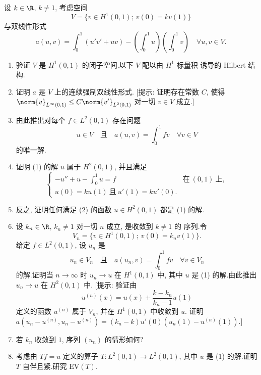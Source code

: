 \begin{exercise}
\label{exer:8.30}
设 $k\in\R$, $k\ne1$, 考虑空间
\begin{equation*}
V=\{v\in H^1(0,1);\ v(0)=kv(1)\}
\end{equation*}
与双线性形式
\begin{equation*}
a(u,v)=\int_0^1(u'v'+uv)
-\left(\int_0^1u\right)\left(\int_0^1v\right)\quad\forall u,v\in V.
\end{equation*}
\begin{enumerate}[label=\arabic*., leftmargin=2.2em, itemsep=0.3em]
	\item 验证 $V$ 是 $H^1(0,1)$ 的闭子空间.以下 $V$ 配以由 $H^1$ 标量积
	      诱导的 Hilbert 结构.
	\item 证明 $a$ 是 $V$ 上的连续强制双线性形式.
	      [提示: 证明存在常数 $C$, 使得
	      $\norm{v}_{L^\infty(0,1)}\le C\norm{v'}_{L^2(0,1)}$ 对一切
	      $v\in V$ 成立.]
	\item 由此推出对每个 $f\in L^2(0,1)$ 存在问题
	      \begin{equation}
	      u\in V\quad\text{且}\quad
	      a(u,v)=\int_0^1fv\quad\forall v\in V
	      \tag{1}
	      \end{equation}
	      的唯一解.
	\item 证明 (1) 的解 $u$ 属于 $H^2(0,1)$, 并且满足
	      \begin{equation}
	      \begin{cases}
	      -u''+u-\int_0^1u=f & \text{在}\ (0,1)\ \text{上},\\
	      u(0)=ku(1)\ \text{且}\ u'(1)=ku'(0).
	      \end{cases}
	      \tag{2}
	      \end{equation}
	\item 反之, 证明任何满足 (2) 的函数 $u\in H^2(0,1)$ 都是 (1) 的解.
	\item 设 $k_n\in\R$, $k_n\ne1$ 对一切 $n$ 成立, 是收敛到 $k\ne1$ 的
	      序列.令
	      \begin{equation*}
	      V_n=\{v\in H^1(0,1);\ v(0)=k_nv(1)\}.
	      \end{equation*}
	      给定 $f\in L^2(0,1)$, 设 $u_n$ 是
	      \begin{equation}
	      u_n\in V_n\quad\text{且}\quad
	      a(u_n,v)=\int_0^1fv\quad\forall v\in V_n
	      \tag{$1_n$}
	      \end{equation}
	      的解.证明当 $n\to\infty$ 时 $u_n\to u$ 在 $H^1(0,1)$ 中, 其中
	      $u$ 是 (1) 的解.由此推出 $u_n\to u$ 在 $H^2(0,1)$ 中.
	      [提示: 验证由
	      \begin{equation*}
	      u^{(n)}(x)=u(x)+\frac{k-k_n}{k_n-1}u(1)
	      \end{equation*}
	      定义的函数 $u^{(n)}$ 属于 $V_n$, 并在 $H^1(0,1)$ 中收敛到 $u$.
	      证明
	      $a(u_n-u^{(n)},u_n-u^{(n)})=(k_n-k)u'(0)(u_n(1)-u^{(n)}(1))$.]
	\item 若 $k_n$ 收敛到 $1$, 序列 $(u_n)$ 的情形如何?
	\item 考虑由 $Tf=u$ 定义的算子 $T:L^2(0,1)\to L^2(0,1)$, 其中 $u$
	      是 (1) 的解.证明 $T$ 自伴且紧.研究 $\mathrm{EV}(T)$.
\end{enumerate}
\end{exercise}


